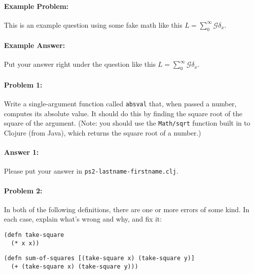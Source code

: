 \documentclass[10pt]{article}
\newcommand{\PSnum}{2}
\begin{document}
\noindent\hrulefill %

\paragraph{Example Problem:}
This is an example question using some fake math like this
$L=\sum_0^{\infty} \mathcal{G} \delta_x$.

\paragraph{Example Answer:} Put your answer right under the question like
this $L=\sum_0^{\infty} \mathcal{G} \delta_x$.

\noindent\hrulefill%

\pagebreak%

\noindent\hrulefill %

\paragraph{Problem 1:}
Write a single-argument function called \texttt{absval} that, when passed a number, computes its 
absolute value. It should do this by finding the square root of the square of the argument. 
(Note: you should use the \texttt{Math/sqrt} function built in to Clojure (from Java), which
returns the square root of a number.)

\paragraph{Answer 1:} Please put your answer in \texttt{ps\PSnum-lastname-firstname.clj}.

\noindent\hrulefill %

\paragraph{Problem 2:}
In both of the following definitions, there are one or more errors of
some kind. In each case, explain what's wrong and why, and fix it:

\begin{lstlisting}
(defn take-square
  (* x x))
\end{lstlisting}

\begin{lstlisting}
(defn sum-of-squares [(take-square x) (take-square y)]
  (+ (take-square x) (take-square y)))
\end{lstlisting}
\end{document}

